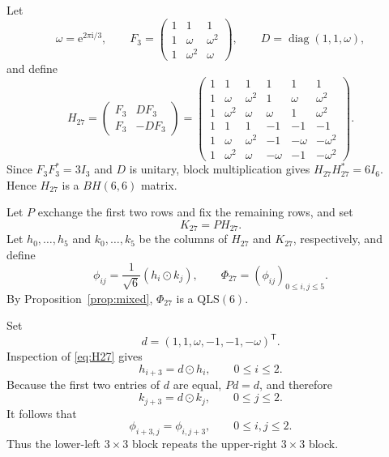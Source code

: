 \documentclass[11pt,a4paper]{article}
\newcommand{\QLS}{\mathrm{QLS}}
\newcommand{\od}{\mathbin{\odot}}
\newcommand{\ii}{\mathrm{i}}
\newcommand{\e}{\mathrm{e}}
\begin{document}
Let
\[
 \omega=\e^{2\pi\ii/3},
 \qquad
 F_3=\begin{pmatrix}
 1&1&1\\
 1&\omega&\omega^2\\
 1&\omega^2&\omega
 \end{pmatrix},
 \qquad
 D=\operatorname{diag}(1,1,\omega),
\]
and define
\begin{equation}\label{eq:H27}
 H_{27}=
 \begin{pmatrix}
  F_3&D F_3\\
  F_3&-D F_3
 \end{pmatrix}
 =
 \begin{pmatrix}
 1&1&1&1&1&1\\
 1&\omega&\omega^2&1&\omega&\omega^2\\
 1&\omega^2&\omega&\omega&1&\omega^2\\
 1&1&1&-1&-1&-1\\
 1&\omega&\omega^2&-1&-\omega&-\omega^2\\
 1&\omega^2&\omega&-\omega&-1&-\omega^2
 \end{pmatrix}.
\end{equation}
Since $F_3F_3^*=3I_3$ and $D$ is unitary, block multiplication gives
$H_{27}H_{27}^*=6I_6$.  Hence $H_{27}$ is a $BH(6,6)$ matrix.

Let $P$ exchange the first two rows and fix the remaining rows, and set
\[
 K_{27}=PH_{27}.
\]
Let $h_0,\ldots,h_5$ and $k_0,\ldots,k_5$ be the columns of $H_{27}$ and
$K_{27}$, respectively, and define
\begin{equation}\label{eq:Phi27}
 \phi_{ij}=\frac1{\sqrt6}(h_i\od k_j),
 \qquad
 \Phi_{27}=(\phi_{ij})_{0\leq i,j\leq5}.
\end{equation}
By Proposition~\ref{prop:mixed}, $\Phi_{27}$ is a $\QLS(6)$.

Set
\[
 d=(1,1,\omega,-1,-1,-\omega)^{\mathsf T}.
\]
Inspection of \eqref{eq:H27} gives
\[
 h_{i+3}=d\od h_i,
 \qquad 0\leq i\leq2.
\]
Because the first two entries of $d$ are equal, $Pd=d$, and therefore
\[
 k_{j+3}=d\od k_j,
 \qquad 0\leq j\leq2.
\]
It follows that
\begin{equation}\label{eq:nineequalities}
 \phi_{i+3,j}=\phi_{i,j+3},
 \qquad 0\leq i,j\leq2.
\end{equation}
Thus the lower-left $3\times3$ block repeats the upper-right $3\times3$ block.
\end{document}
